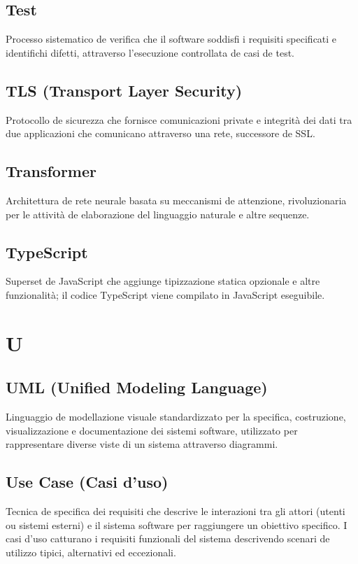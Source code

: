\documentclass[a4paper,11pt]{article}
\begin{document}
\subsection{Test}
Processo sistematico de verifica che il software soddisfi i requisiti specificati e identifichi difetti, attraverso l'esecuzione controllata de casi de test.

\subsection{TLS (Transport Layer Security)}
Protocollo de sicurezza che fornisce comunicazioni private e integrità dei dati tra due applicazioni che comunicano attraverso una rete, successore de SSL.

\subsection{Transformer}
Architettura de rete neurale basata su meccanismi de attenzione, rivoluzionaria per le attività de elaborazione del linguaggio naturale e altre sequenze.

\subsection{TypeScript}
Superset de JavaScript che aggiunge tipizzazione statica opzionale e altre funzionalità; il codice TypeScript viene compilato in JavaScript eseguibile.

\newpage
\section{U}

\subsection{UML (Unified Modeling Language)}
Linguaggio de modellazione visuale standardizzato per la specifica, costruzione, visualizzazione e documentazione dei sistemi software, utilizzato per rappresentare diverse viste di un sistema attraverso diagrammi.

\subsection{Use Case (Casi d'uso)}
Tecnica de specifica dei requisiti che descrive le interazioni tra gli attori (utenti ou sistemi esterni) e il sistema software per raggiungere un obiettivo specifico. I casi d'uso catturano i requisiti funzionali del sistema descrivendo scenari de utilizzo tipici, alternativi ed eccezionali.
\end{document}
